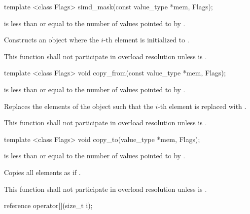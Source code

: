\begin{itemdecl}
template <class Flags> simd_mask(const value_type *mem, Flags);
\end{itemdecl}
\begin{itemdescr}
  \flagsRequires{\mask{}}
   is less than or equal to the number of values pointed to by .

  \pnum\effects Constructs an object where the $i$-th element is initialized to  \foralli.

  \pnum\remarks This function shall not participate in overload resolution unless  is \true.
\end{itemdescr}

\begin{itemdecl}
template <class Flags> void copy_from(const value_type *mem, Flags);
\end{itemdecl}
\begin{itemdescr}
  \flagsRequires{\mask{}}
   is less than or equal to the number of values pointed to by .

  \pnum\effects Replaces the elements of the \mask object such that the $i$-th element is replaced with  \foralli.

  \pnum\remarks This function shall not participate in overload resolution unless  is \true.
\end{itemdescr}

\begin{itemdecl}
template <class Flags> void copy_to(value_type *mem, Flags);
\end{itemdecl}
\begin{itemdescr}
  \flagsRequires{\mask{}}
   is less than or equal to the number of values pointed to by .

  \pnum\effects Copies all \mask elements as if  \foralli.

  \pnum\remarks This function shall not participate in overload resolution unless  is \true.
\end{itemdescr}

\begin{itemdecl}
reference operator[](size_t i);
\end{itemdecl}
\begin{itemdescr}
  \simdElementReference{\mask{}}
\end{itemdescr}

